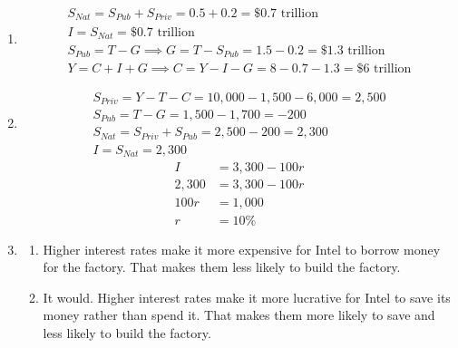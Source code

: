 \documentclass{article}
\begin{document}
\begin{enumerate}
\begin{enumerate}
	\item Saving -- A stock isn't capital.
	
	\item Saving -- The deposit is money left over after consumption and taxes. Here, taxes are relevant because individuals contribute to private saving, and private saving is income left over after consumption and taxes.
	
	\item Investment -- A car for a delivery business is a capital good.
	
	\end{enumerate}
	
\item \begin{gather*}
	S_{Nat} = S_{Pub} + S_{Priv} = 0.5 + 0.2 = \$0.7 \text{ trillion} \\
	I = S_{Nat} = \$0.7 \text{ trillion} \\
	S_{Pub} = T - G \implies G = T - S_{Pub} = 1.5 - 0.2 = \$1.3 \text{ trillion} \\
	Y = C + I + G \implies C = Y - I - G = 8 - 0.7 - 1.3 = \$ 6 \text{ trillion}
	\end{gather*}
	
\item \begin{gather*}
	S_{Priv} = Y - T - C = 10,000 - 1,500 - 6,000 = 2,500 \\
	S_{Pub} = T - G = 1,500 - 1,700 = -200 \\
	S_{Nat} = S_{Priv} + S_{Pub} = 2,500 - 200 = 2,300 \\
	I = S_{Nat} = 2,300
	\end{gather*}
	\begin{align*}
	I &= 3,300 - 100r \\
	2,300 &= 3,300 - 100r \\
	100r &= 1,000 \\
	r &= 10\%
	\end{align*}
	
\item

	\begin{enumerate}
	
	\item Higher interest rates make it more expensive for Intel to borrow money for the factory. That makes them less likely to build the factory. 
	
	\item It would. Higher interest rates make it more lucrative for Intel to save its money rather than spend it. That makes them more likely to save and less likely to build the factory.
	

\end{enumerate}
\end{enumerate}
\end{document}
